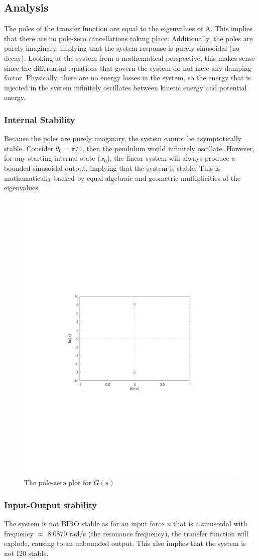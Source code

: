 \documentclass[10pt]{article}
\begin{document}
\subsection{Analysis}
The poles of the transfer function are equal to the eigenvalues of A. This implies that there are no pole-zero cancellations taking place. Additionally, the poles are purely imaginary, implying that the system response is purely sinusoidal (no decay). Looking at the system from a mathematical perspective, this makes sense since the differential equations that govern the system do not have any damping factor. Physically, there are no energy losses in the system, so the energy that is injected in the system infinitely oscillates between kinetic energy and potential energy. 

\subsubsection{Internal Stability}
Because the poles are purely imaginary, the system cannot be asymptotically stable. Consider $\theta_0 = \pi/4$, then the pendulum would infinitely oscillate. However, for any starting internal state ($x_0$), the linear system will always produce a bounded sinusoidal output, implying that the system is stable. This is mathematically backed by equal algebraic and geometric multiplicities of the eigenvalues.

\begin{figure}[ht]
    \centering
        \includegraphics[clip, trim=4.3cm 8.3cm 4.5cm 9.3cm,width=0.45\linewidth]{lab1/figs/section6_pole_zero_gs.pdf}
        \caption{The pole-zero plot for $G(s)$}
\end{figure}

\subsubsection{Input-Output stability}
The system is not BIBO stable as for an input force $u$ that is a sinusoidal with frequency $\approx$ 8.0870 rad/s (the resonance frequency), the transfer function will explode, causing to an unbounded output. This also implies that the system is not I20 stable.
\end{document}
